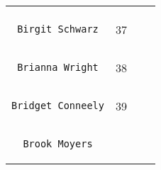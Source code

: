 \documentclass[]{article}
\begin{document}
\begin{longtable}[c]{@{}llll@{}}
\begin{minipage}[t]{0.15\columnwidth}
\end{minipage}
\\\noalign{\medskip}
\begin{minipage}[t]{0.39\columnwidth}\raggedright
\begin{verbatim}
 Birgit Schwarz
\end{verbatim}
\end{minipage} & \begin{minipage}[t]{0.10\columnwidth}\raggedright
37
\end{minipage} & \begin{minipage}[t]{0.13\columnwidth}\raggedright
\end{minipage} & \begin{minipage}[t]{0.15\columnwidth}\raggedright
\end{minipage}
\\\noalign{\medskip}
\begin{minipage}[t]{0.39\columnwidth}\raggedright
\begin{verbatim}
 Brianna Wright
\end{verbatim}
\end{minipage} & \begin{minipage}[t]{0.10\columnwidth}\raggedright
38
\end{minipage} & \begin{minipage}[t]{0.13\columnwidth}\raggedright
\end{minipage} & \begin{minipage}[t]{0.15\columnwidth}\raggedright
\end{minipage}
\\\noalign{\medskip}
\begin{minipage}[t]{0.39\columnwidth}\raggedright
\begin{verbatim}
Bridget Conneely
\end{verbatim}
\end{minipage} & \begin{minipage}[t]{0.10\columnwidth}\raggedright
39
\end{minipage} & \begin{minipage}[t]{0.13\columnwidth}\raggedright
\end{minipage} & \begin{minipage}[t]{0.15\columnwidth}\raggedright
\end{minipage}
\\\noalign{\medskip}
\begin{minipage}[t]{0.39\columnwidth}\raggedright
\begin{verbatim}
  Brook Moyers

\end{verbatim}
\end{minipage}
\end{longtable}
\end{document}
